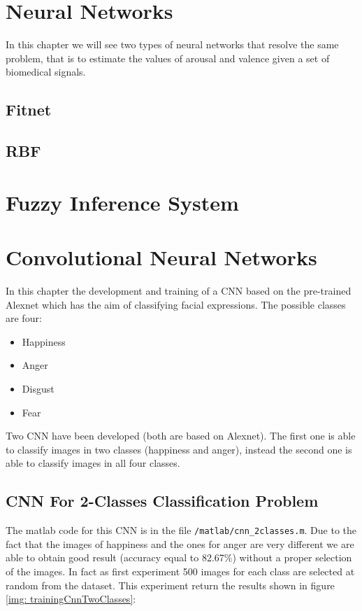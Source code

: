 \documentclass[a4paper]{report}
\begin{document}
\chapter{Neural Networks}
	\noindent In this chapter we will see two types of neural networks that resolve the same problem, that is to estimate the values of arousal and valence given a set of biomedical signals.	
	\section{Fitnet}
	\section{RBF}
	
	\chapter{Fuzzy Inference System}
	
	\chapter{Convolutional Neural Networks}
	\noindent In this chapter the development and training of a CNN based on the pre-trained Alexnet which has the aim of classifying facial expressions. The possible classes are four:
	\begin{itemize}
		\item Happiness
		\item Anger
		\item Disgust
		\item Fear
	\end{itemize} 
	\noindent Two CNN have been developed (both are based on Alexnet). The first one is able to classify images in two classes (happiness and anger), instead the second one is able to classify images in all four classes.
	
	\section{CNN For 2-Classes Classification Problem}
	\noindent The matlab code for this CNN is in the file \texttt{/matlab/cnn\_2classes.m}. Due to the fact that the images of happiness and the ones for anger are very different we are able to obtain good result (accuracy equal to 82.67\%) without a proper selection of the images.
	\noindent In fact as first experiment 500 images for each class are selected at random from the dataset. This experiment return the results shown in figure \ref{img: trainingCnnTwoClasses}:
	
\end{document}
